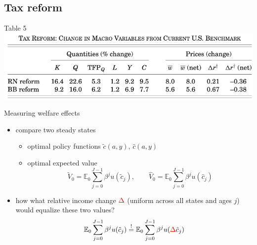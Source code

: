 \documentclass[aspectratio=169,mathserif]{beamer}
\begin{document}

\subsection{Tax reform}

\begin{frame}{Table 5}
    \centering
    \includegraphics[scale = 0.4]{GKKOC_Tab5.png}
\end{frame}

\begin{frame}{Measuring welfare effects}

    \begin{itemize}
        \item compare two steady states
        \begin{itemize}
            \item optimal policy functions $\tilde c(a, y)$, $\hat c(a, y)$
            \item optimal expected value
            $$\tilde V_0 = \mathbb{E}_0 \sum_{j=0}^{J-1} \beta^j u(\tilde c_j), \qquad \hat V_0 = \mathbb{E}_0 \sum_{j=0}^{J-1} \beta^j u(\hat c_j)$$
        \end{itemize}
        \item how what relative income change $\textcolor{red}{\Delta}$ (uniform across all states and ages $j$) would equalize these two values?
        \begin{equation*}
            \mathbb{E}_0 \sum_{j=0}^{J-1} \beta^j u(\tilde c_j) \stackrel{!}{=} \mathbb{E}_0 \sum_{j=0}^{J-1} \beta^j u(\textcolor{red}{\Delta} \hat c_j)
        \end{equation*}
    \end{itemize}
\end{frame}
\end{document}
